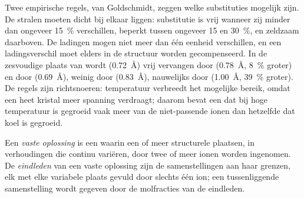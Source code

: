 Twee empirische regels, van Goldschmidt, zeggen welke substituties mogelijk zijn. De stralen moeten dicht bij elkaar liggen:
substitutie is vrij wanneer zij minder dan ongeveer \qty{15}{\percent} verschillen, beperkt tussen ongeveer 15 en \qty{30}{\percent}, en
zeldzaam daarboven. De ladingen mogen niet meer dan één eenheid verschillen, en een ladingsverschil moet elders in de structuur
worden gecompenseerd. In de zesvoudige plaats van  wordt  (\qty{0.72}{\angstrom}) vrij vervangen door
 (\qty{0.78}{\angstrom}, \qty{8}{\percent} groter) en door  (\qty{0.69}{\angstrom}), weinig door
 (\qty{0.83}{\angstrom}), nauwelijks door  (\qty{1.00}{\angstrom}, \qty{39}{\percent} groter).
De regels zijn richtsnoeren: temperatuur verbreedt het mogelijke bereik, omdat een heet kristal meer spanning verdraagt; daarom
bevat een  dat bij hoge temperatuur is gegroeid vaak meer van de niet-passende ionen dan hetzelfde  dat koel is
gegroeid.

\begin{definition}\label{def:b1:rock-forming-minerals:solid-solution}
Een \emph{vaste oplossing} is een  waarin een of meer structurele plaatsen, in
verhoudingen die continu variëren, door twee of meer ionen worden ingenomen. De \emph{eindleden} van een
vaste oplossing zijn de samenstellingen aan haar grenzen, elk met elke variabele plaats gevuld door slechts één ion; een
tussenliggende samenstelling wordt gegeven door de molfracties van de eindleden.
\end{definition}

